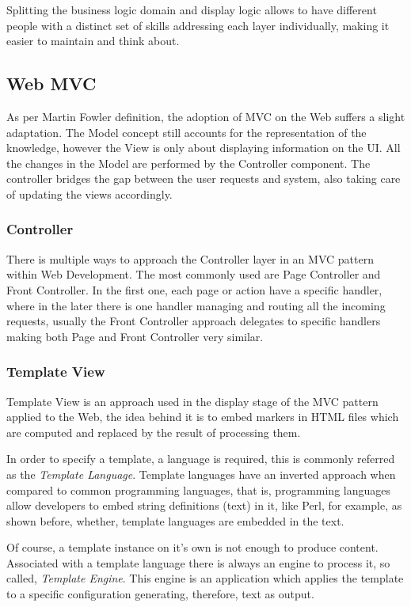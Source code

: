 Splitting the business logic domain and display logic allows to have different people with a distinct set of skills addressing each layer individually, making it easier to maintain and think about.

\subsection{Web MVC}

As per Martin Fowler \cite{Fowler2003PatternsArchitecture} definition, the adoption of MVC on the Web suffers a slight adaptation. The Model concept still accounts for the representation of the knowledge, however the View is only about displaying information on the UI. All the changes in the Model are performed by the Controller component. The controller bridges the gap between the user requests and system, also taking care of updating the views accordingly.

\subsubsection{Controller}

There is multiple ways to approach the Controller layer in an MVC pattern within Web Development. The most commonly used are Page Controller and Front Controller. In the first one, each page or action have a specific handler, where in the later there is one handler managing and routing all the incoming requests, usually the Front Controller approach delegates to specific handlers making both Page and Front Controller very similar. 

\subsubsection{Template View}

Template View is an approach used in the display stage of the MVC pattern applied to the Web, the idea behind it is to embed markers in HTML files which are computed and replaced by the result of processing them.

In order to specify a template, a language is required, this is commonly referred as the \textit{Template Language}. Template languages have an inverted approach when compared to common programming languages, that is, programming languages allow developers to embed string definitions (text) in it, like Perl, for example, as shown before, whether, template languages are embedded in the text.

Of course, a template instance on it's own is not enough to produce content. Associated with a template language there is always an engine to process it, so called, \textit{Template Engine}. This engine is an application which applies the template to a specific configuration generating, therefore, text as output.

